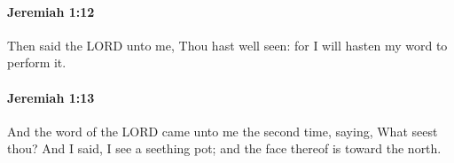 		\paragraph{Jeremiah 1:12} %
			\label{JEREMIAH-1-12}

			Then said the LORD unto me, Thou hast well seen: for I will hasten my word to perform it.


		\paragraph{Jeremiah 1:13} %
			\label{JEREMIAH-1-13}

			And the word of the LORD came unto me the second time, saying, What seest thou? And I said, I see a seething pot; and the face thereof is toward the north.


